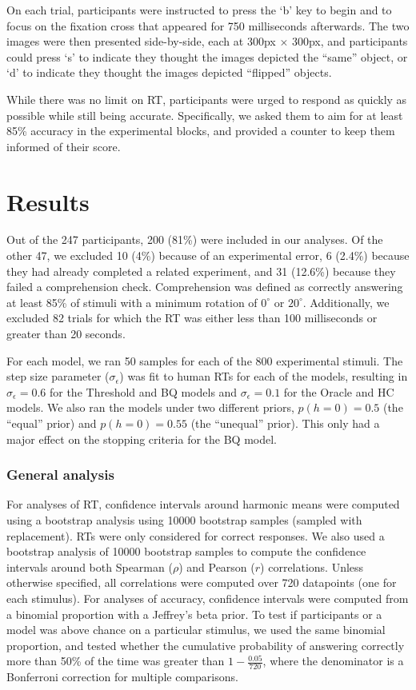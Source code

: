 \documentclass[10pt,letterpaper]{article}
\newcommand{\Oc}[0]{Oracle}
\newcommand{\Th}[0]{Threshold}
\newcommand{\Hc}[0]{HC}
\newcommand{\Bq}[0]{BQ}
\begin{document}
On each trial, participants were instructed to press the `b' key to
begin and to focus on the fixation cross that appeared for 750
milliseconds afterwards. The two images were then presented
side-by-side, each at 300px $\times$ 300px, and participants could
press `s' to indicate they thought the images depicted the ``same''
object, or `d' to indicate they thought the images depicted
``flipped'' objects.

While there was no limit on RT, participants were urged to respond as
quickly as possible while still being accurate. Specifically, we asked
them to aim for at least 85\% accuracy in the experimental blocks, and
provided a counter to keep them informed of their score.

\section{Results}

Out of the 247 participants, 200 (81\%) were included in our
analyses. Of the other 47, we excluded 10 (4\%) because of an
experimental error, 6 (2.4\%) because they had already completed a
related experiment, and 31 (12.6\%) because they failed a
comprehension check. Comprehension was defined as correctly answering
at least 85\% of stimuli with a minimum rotation of $0^\circ$ or
$20^\circ$.  Additionally, we excluded 82 trials for which the RT was
either less than 100 milliseconds or greater than 20 seconds.

For each model, we ran 50 samples for each of the 800 experimental
stimuli. The step size parameter ($\sigma_\epsilon$) was fit to human
RTs for each of the models, resulting in $\sigma_\epsilon=0.6$ for the
\Th{} and \Bq{} models and $\sigma_\epsilon=0.1$ for the \Oc{} and
\Hc{} models. We also ran the models under two different priors,
$p(h=0)=0.5$ (the ``equal'' prior) and $p(h=0)=0.55$ (the ``unequal''
prior). This only had a major effect on the stopping criteria for the
\Bq{} model.

\subsubsection{General analysis}

For analyses of RT, confidence intervals around harmonic means were
computed using a bootstrap analysis using 10000 bootstrap samples
(sampled with replacement). RTs were only considered for correct
responses.  We also used a bootstrap analysis of 10000 bootstrap
samples to compute the confidence intervals around both Spearman
($\rho$) and Pearson ($r$) correlations.  Unless otherwise specified,
all correlations were computed over 720 datapoints (one for each
stimulus). For analyses of accuracy, confidence intervals were
computed from a binomial proportion with a Jeffrey's beta prior.  To
test if participants or a model was above chance on a particular
stimulus, we used the same binomial proportion, and tested whether the
cumulative probability of answering correctly more than 50\% of the
time was greater than $1-\frac{0.05}{720}$, where the denominator is a
Bonferroni correction for multiple comparisons.
\end{document}
